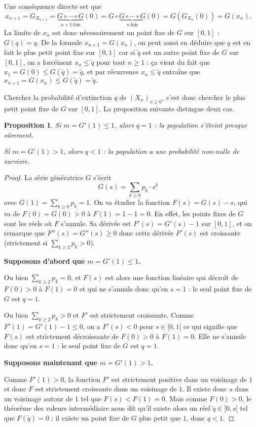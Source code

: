 \documentclass[a4paper,12pt]{book}
\newtheorem{propfr}[thmfr]{Proposition}
\begin{document}
Une conséquence directe est que $$x_{n+1}=G_{X_{n+1}}=\underbrace{G\circ \cdots \circ G}_{n+1\ \text{fois}}(0)=G\circ \underbrace{G\circ \cdots \circ G}_{n\ \text{fois}}(0)=G(G_{X_{n}}(0))=G(x_n).$$ La limite de $x_n$ est donc nécessairement un point fixe de $G$ sur $[0,1]$ : $G(q)=q$. De la formule $x_{n+1}=G(x_n)$, on peut aussi en déduire que $q$ est en fait le plus petit point fixe sur $[0,1]$ car si $\tilde{q}$ est un autre point fixe de $G$ sur $[0,1]$, on a forcément $x_n\leq \tilde{q}$ pour tout $n\geq 1$ : ça vient du fait que $x_1=G(0)\leq G( \tilde{q})=\tilde{q}$, et par récurrence $x_n\leq \tilde{q}$ entraîne que $x_{n+1}=G(x_n)\leq G(\tilde{q})=\tilde{q}.$

Chercher la probabilité d'extinction $q$ de $(X_n)_{n\geq 0}$, c'est donc chercher le plus petit point fixe de $G$ sur $[0,1]$. La proposition suivante distingue deux cas.

\begin{propfr}Si $m=G'(1)\leq 1$, alors $q=1$ : la population s'éteint presque sûrement.

Si $m=G'(1)>1$, alors $q<1$ : la population a une probabilité non-nulle de survivre.
\end{propfr}
\begin{proof}La série génératrice $G$ s'écrit
$$G(s)=\sum_{k\geq 0}p_k\cdot s^k$$
avec $G(1)=\sum_{k\geq 0} p_k=1$.
 On va étudier la fonction $F(s)=G(s)-s$, qui va de $F(0)=G(0)>0$ à $F(1)=1-1=0$. En effet, les points fixes de $G$ sont les réels où $F$ s'annule. Sa dérivée est $F'(s)=G'(s)-1$ sur $[0,1]$, et on remarque que $F''(s)=G''(s)\geq 0$ donc cette dérivée $F'(s)$ est croissante (strictement si $\sum_{k\geq 2} p_k>0$).

\textbf{Supposons d'abord que $m=G'(1)\leq 1$.}

Ou bien $\sum_{k\geq 2} p_k=0$, et $F(s)$ est alors une fonction linéaire qui décroît de $F(0)>0$ à $F(1)=0$ et qui ne s'annule donc qu'en $s=1$ : le seul point fixe de $G$ est $q=1$.

Ou bien $\sum_{k\geq 2} p_k>0$ et $F'$ est strictement croissante. Comme $F'(1)=G'(1)-1\leq 0$, on a $F'(s)<0$ pour $s\in [0,1[$ ce qui signifie que $F(s)$ est strictement décroissante de $F(0)>0$ à $F(1)=0$. Elle ne s'annule donc qu'en $s=1$ : le seul point fixe de $G$ est $q=1$.

\textbf{Supposons maintenant que $m=G'(1)> 1$.}

Comme $F'(1)>0$, la fonction $F'$ est strictement positive dans un voisinage de $1$ et donc $F$ est strictement croissante dans un voisinage de $1$. Il existe donc $s$ dans un voisinage autour de $1$ tel que $F(s)<F(1)=0$. Mais comme $F(0)>0$, le théorème des valeurs intermédiaire nous dit qu'il existe alors un réel $\tilde{q}\in ]0,s[$ tel que $F(\tilde{q})=0$ : il existe un point fixe de $G$ plus petit que $1$, donc $q<1$.
\end{proof}
\end{document}
